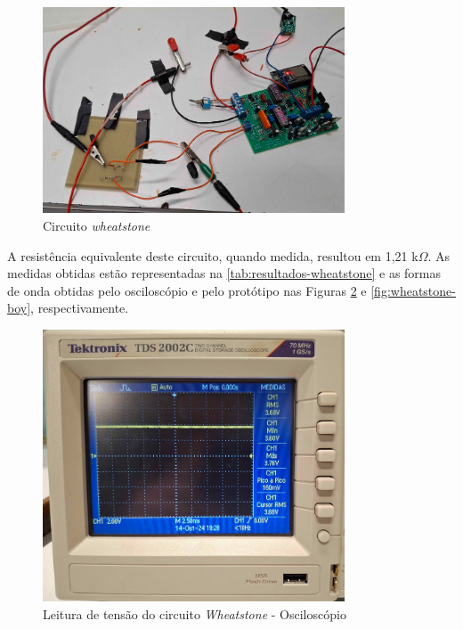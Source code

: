 \begin{figure}[htb!]
    \caption{Circuito \textit{wheatstone}}
    \vspace*{5mm}
    \label{fig:circuito-wheatstone-full}
    \includegraphics[width=0.8\textwidth]{figuras/circuito-wheatstone-full.png}
    \fonte{}
\end{figure}

A resistência equivalente deste circuito, quando medida, resultou em 1,21 k$\Omega$. As medidas obtidas estão representadas na \autoref{tab:resultados-wheatstone} e as formas de onda obtidas pelo osciloscópio e pelo protótipo nas Figuras \ref{fig:wheatstone-osc} e \ref{fig:wheatstone-boy}, respectivamente.

\begin{figure}[htb!]
    \caption{Leitura de tensão do circuito \textit{Wheatstone} - Osciloscópio}
    \vspace*{5mm}
    \label{fig:wheatstone-osc}
    \includegraphics[width=0.8\textwidth]{figuras/wheatstone-osc.png}
    \fonte{}
\end{figure}

